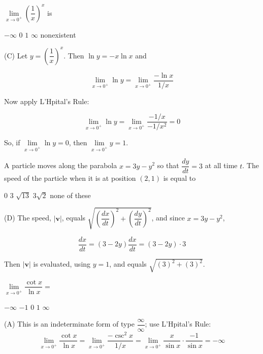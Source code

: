 \question
$\lim\limits_{x \to 0^{+}}\left(\dfrac{1}{x}\right)^{x}$ is
\begin{choices}
  \choice $-\infty$
  \choice $0$
  \CorrectChoice $1$
  \choice $\infty$
  \choice nonexistent
\end{choices}
\begin{solution}
(C) Let $y=\left(\dfrac{1}{x}\right)^{x}$. Then $\ln y=-x \ln x$ and

\[
\lim\limits_{x \to 0^{+}} \ln y=\lim\limits_{x \to 0^{+}} \dfrac{-\ln x}{1 / x}
\]

Now apply L'Hpital's Rule:

\[
\lim\limits_{x \to 0^{+}} \ln y=\lim\limits_{x \to 0^{+}} \dfrac{-1 / x}{-1 / x^{2}}=0
\]

So, if $\lim\limits_{x \to 0^{+}} \ln y=0$, then $\lim\limits_{x \to 0^{+}} y=1$.
\end{solution}





\newpage





\question
A particle moves along the parabola $x=3 y-y^{2}$ so that $\dfrac{d y}{d t}=3$ at all time $t$. The speed of the particle when it is at position $(2,1)$ is equal to
\begin{choices}
  \choice $0$
  \choice $3$
  \choice $\sqrt{13}$
  \CorrectChoice $3 \sqrt{2}$
  \choice none of these
\end{choices}
\begin{solution}
(D) The speed, $|\mathbf{v}|$, equals $\sqrt{\left(\dfrac{d x}{d t}\right)^{2}+\left(\dfrac{d y}{d t}\right)^{2}}$, and since $x=3 y-y^{2}$,

\[
\dfrac{d x}{d t}=(3-2 y) \dfrac{d x}{d t}=(3-2 y) \cdot 3
\]

Then $|\mathbf{v}|$ is evaluated, using $y=1$, and equals $\sqrt{(3)^{2}+(3)^{2}}$.
\end{solution}

\question
$\lim\limits_{x \to 0^{+}} \dfrac{\cot x}{\ln x}=$
\begin{choices}
  \CorrectChoice $-\infty$
  \choice $-1$
  \choice $0$
  \choice $1$
  \choice $\infty$
\end{choices}
\begin{solution}
(A) This is an indeterminate form of type $\dfrac{\infty}{\infty}$; use L'Hpital's Rule:
\[
\lim\limits_{x \to 0^{+}} \dfrac{\cot x}{\ln x}=\lim\limits_{x \to 0^{+}} \dfrac{-\csc ^{2} x}{1 / x}=\lim\limits_{x \to 0^{+}} \dfrac{x}{\sin x} \cdot \dfrac{-1}{\sin x}=-\infty
\]
\end{solution}


